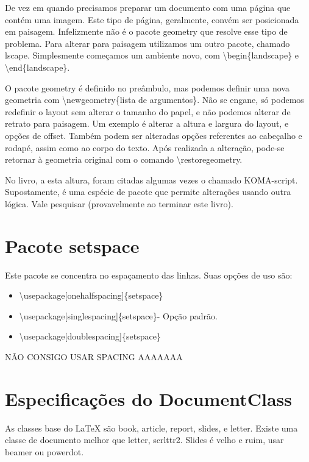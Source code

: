 De vez em quando precisamos preparar um documento com uma página que contém uma imagem.
Este tipo de página, geralmente, convém ser posicionada em paisagem.
Infelizmente não é o pacote geometry que resolve esse tipo de problema.
Para alterar para paisagem utilizamos um outro pacote, chamado lscape.
Simplesmente começamos um ambiente novo, com \textbackslash begin\{landscape\} e \textbackslash end\{landscape\}.

O pacote geometry é definido no preâmbulo, mas podemos definir uma nova geometria com \textbackslash newgeometry\{lista de argumentos\}.
Não se engane, só podemos redefinir o layout sem alterar o tamanho do papel, e não podemos alterar de retrato para paisagem.
Um exemplo é alterar a altura e largura do layout, e opções de offset.
Também podem ser alteradas opções referentes ao cabeçalho e rodapé, assim como ao corpo do texto.
Após realizada a alteração, pode-se retornar à geometria original com o comando \textbackslash restoregeometry.

No livro, a esta altura, foram citadas algumas vezes o chamado KOMA-script.
Supostamente, é uma espécie de pacote que permite alterações usando outra lógica.
Vale pesquisar (provavelmente ao terminar este livro).

\section{Pacote setspace}
Este pacote se concentra no espaçamento das linhas.
Suas opções de uso são:
\begin{itemize}
    \item \textbackslash usepackage[onehalfspacing]\{setspace\}
    \item \textbackslash usepackage[singlespacing]\{setspace\}- Opção padrão.
    \item \textbackslash usepackage[doublespacing]\{setspace\}
\end{itemize}

NÃO CONSIGO USAR SPACING AAAAAAA

\section{Especificações do DocumentClass}
As classes base do LaTeX são book, article, report, slides, e letter.
Existe uma classe de documento melhor que letter, scrlttr2.
Slides é velho e ruim, usar beamer ou powerdot.

